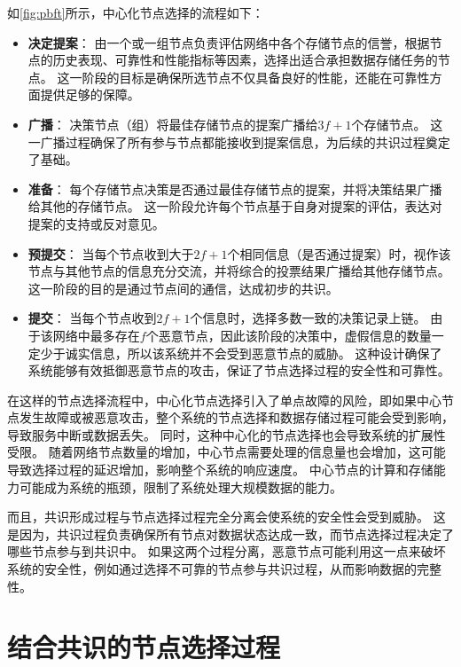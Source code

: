 如\autoref{fig:pbft}所示，中心化节点选择的流程如下：
\begin{itemize}
    \item \textbf{决定提案}：
    由一个或一组节点负责评估网络中各个存储节点的信誉，根据节点的历史表现、可靠性和性能指标等因素，选择出适合承担数据存储任务的节点。
    这一阶段的目标是确保所选节点不仅具备良好的性能，还能在可靠性方面提供足够的保障。
    \item \textbf{广播}：
    决策节点（组）将最佳存储节点的提案广播给$3f+1$个存储节点。
    这一广播过程确保了所有参与节点都能接收到提案信息，为后续的共识过程奠定了基础。
    \item \textbf{准备}：
    每个存储节点决策是否通过最佳存储节点的提案，并将决策结果广播给其他的存储节点。
    这一阶段允许每个节点基于自身对提案的评估，表达对提案的支持或反对意见。
    \item \textbf{预提交}：
    当每个节点收到大于$2f+1$个相同信息（是否通过提案）时，视作该节点与其他节点的信息充分交流，并将综合的投票结果广播给其他存储节点。
    这一阶段的目的是通过节点间的通信，达成初步的共识。
    \item \textbf{提交}：
    当每个节点收到$2f+1$个信息时，选择多数一致的决策记录上链。
    由于该网络中最多存在$f$个恶意节点，因此该阶段的决策中，虚假信息的数量一定少于诚实信息，所以该系统并不会受到恶意节点的威胁。
    这种设计确保了系统能够有效抵御恶意节点的攻击，保证了节点选择过程的安全性和可靠性。
\end{itemize}

在这样的节点选择流程中，中心化节点选择引入了单点故障的风险，即如果中心节点发生故障或被恶意攻击，整个系统的节点选择和数据存储过程可能会受到影响，导致服务中断或数据丢失。
同时，这种中心化的节点选择也会导致系统的扩展性受限。
随着网络节点数量的增加，中心节点需要处理的信息量也会增加，这可能导致选择过程的延迟增加，影响整个系统的响应速度。
中心节点的计算和存储能力可能成为系统的瓶颈，限制了系统处理大规模数据的能力。

而且，共识形成过程与节点选择过程完全分离会使系统的安全性会受到威胁。
这是因为，共识过程负责确保所有节点对数据状态达成一致，而节点选择过程决定了哪些节点参与到共识中。
如果这两个过程分离，恶意节点可能利用这一点来破坏系统的安全性，例如通过选择不可靠的节点参与共识过程，从而影响数据的完整性。

\section{结合共识的节点选择过程}

